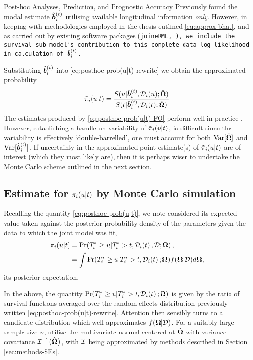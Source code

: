\begin{chapter}{\label{cha:posthoc}Post-hoc Analyses, Prediction, and Prognostic Accuracy}
Previously \citet{Rizopoulos2011} found the modal estimate $\hat{\bm{b}}_i^{(t)}$ utilising available longitudinal information \textit{only}. However, in keeping with methodologies employed in the thesis outlined \eqref{eq:approx-bhat}, and as carried out by existing software packages (\tt{joineRML}, \citet{Hickey2018}), we include the survival sub-model's contribution to this complete data log-likelihood in calculation of $\hat{\bm{b}}_i^{(t)}$.

Substituting $\hat{\bm{b}}_i^{(t)}$ into \eqref{eq:posthoc-prob(u|t)-rewrite} we obtain the approximated probability
\begin{align}
    \tilde{\pi}_i\!\left( u|t\right)=\frac{S(u|\hat{\bm{b}}_i^{(t)},\mathcal{D}_i(u);\hat{\bm{\Omega}})}{S(t|\hat{\bm{b}}_i^{(t)},\mathcal{D}_i(t);\hat{\bm{\Omega}})}
\label{eq:posthoc-prob(u|t)-FO}
\end{align}
The estimates produced by \eqref{eq:posthoc-prob(u|t)-FO} perform well in practice \citep{Rizopoulos2011}. However, establishing a handle on variability of $\tilde{\pi}_i\!\left( u|t\right)$, is difficult since the variability is effectively `double-barrelled', \ie one must account for both $\mathrm{Var}[\hat{\bm{\Omega}}]$ and $\mathrm{Var}[\hat{\bm{b}}_i^{(t)}]$. If uncertainty in the approximated point estimate(s) of $\tilde{\pi}_i\!\left( u|t\right)$ are of interest (which they most likely are), then it is perhaps wiser to undertake the Monte Carlo scheme outlined in the next section.

\subsection{Estimate for \texorpdfstring{$\pi_i\!\left( u |t\right)$}{piut} by Monte Carlo simulation}\label{sec:posthoc-dynpreds-estimation-MC}
Recalling the quantity \eqref{eq:posthoc-prob(u|t)}, we note \citet{Rizopoulos2011} considered its expected value taken against the posterior probability density of the parameters given the data to which the joint model was fit,
\begin{align}
    \nonumber \pi_i\!\left( u|t\right) &= \Pr\!\left( T_i^*\ge u|T_i^*>t,\mathcal{D}_i\!\left( t\right),\mathcal{D}; \bm{\mathrm{\Omega}}\right),\\
    &=\int\Pr(T_i^*\ge u|T_i^*>t,\mathcal{D}_i\!\left( t\right);\bm{\mathrm{\Omega}})f(\bm{\mathrm{\Omega}}|\mathcal{D})d\bm{\mathrm{\Omega}},
\label{eq:posthoc-prob(u|t)-posteriorExp}
\end{align}
\ie its posterior expectation.

In the above, the quantity $\Pr(T_i^*\ge u|T_i^*>t,\mathcal{D}_i\!\left( t\right);\bm{\mathrm{\Omega}})$ is given by the ratio of survival functions averaged over the random effects distribution previously written \eqref{eq:posthoc-prob(u|t)-rewrite}. Attention then sensibly turns to a candidate distribution which well-approximates $f(\bm{\mathrm{\Omega}}|\mathcal{D})$. For a suitably large sample size $n$, \citet{Rizopoulos2011} utilise the multivariate normal centered at $\hat{\bm{\Omega}}$ with variance-covariance $\mathcal{I}^{-1}\big(\hat{\bm{\Omega}}\big)$, with $\cal I$ being approximated by methods described in Section \ref{sec:methods-SEs}. 


\end{chapter}
